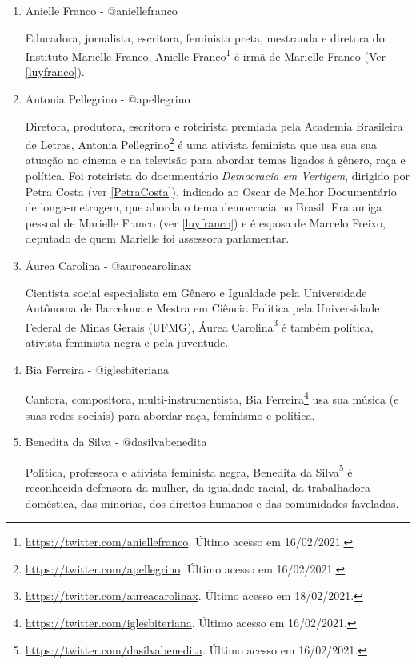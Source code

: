 \documentclass[
	12pt,				%
	openright,			%
	twoside,			%
	a4paper,			%
	english,			%
	brazil				%
	]{abntex2}
\begin{document}
\begin{anexosenv}
\begin{enumerate}
 \item Anielle Franco - @aniellefranco\label{aniellefranco}
 
 Educadora, jornalista, escritora, feminista preta, mestranda e diretora do Instituto Marielle Franco, Anielle Franco\footnote{\url{https://twitter.com/aniellefranco}. Último acesso em 16/02/2021.} é irmã de Marielle Franco (Ver \ref{luyfranco}).

\newpage

 \item Antonia Pellegrino - @apellegrino\label{pellegrino}
 
 Diretora, produtora, escritora e roteirista premiada pela Academia Brasileira de Letras, Antonia Pellegrino\footnote{\url{https://twitter.com/apellegrino}. Último acesso em 16/02/2021.} é uma ativista feminista que usa sua sua atuação no cinema e na televisão para abordar temas ligados à gênero, raça e política. Foi roteirista do documentário \textit{Democracia em Vertigem}, dirigido por Petra Costa (ver \ref{PetraCosta}), indicado ao Oscar de Melhor Documentário de longa-metragem, que aborda o tema democracia no Brasil. Era amiga pessoal de Marielle Franco (ver \ref{luyfranco}) e é esposa de Marcelo Freixo, deputado de quem Marielle foi assessora parlamentar.

 \item Áurea Carolina - @aureacarolinax
 
 Cientista social especialista em Gênero e Igualdade pela Universidade Autônoma de Barcelona e Mestra em Ciência Política pela Universidade Federal de Minas Gerais (UFMG), Áurea Carolina\footnote{\url{https://twitter.com/aureacarolinax}. Último acesso em 18/02/2021.} é também política, ativista feminista negra e pela juventude.

 \item Bia Ferreira - @iglesbiteriana
 
 Cantora, compositora, multi-instrumentista, Bia Ferreira\footnote{\url{https://twitter.com/iglesbiteriana}. Último acesso em 16/02/2021.} usa sua música (e suas redes sociais) para abordar raça, feminismo e política.
 
 \item Benedita da Silva - @dasilvabenedita
 
 Política, professora e ativista feminista negra, Benedita da Silva\footnote{\url{https://twitter.com/dasilvabenedita}. Último acesso em 16/02/2021.} é reconhecida defensora da mulher, da igualdade racial, da trabalhadora doméstica, das minorias, dos direitos humanos e das comunidades faveladas.


\end{enumerate}
\end{anexosenv}
\end{document}
